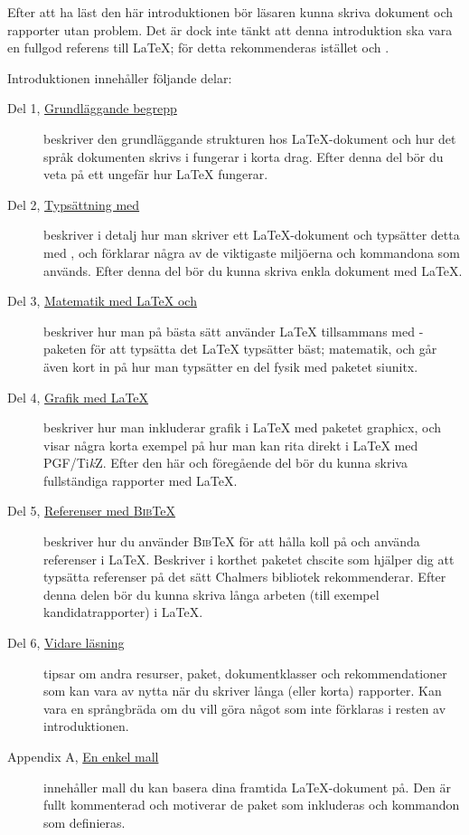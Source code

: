 \documentclass[swe,12pt]{skrapport}
\newcommand\pack[1]{\textsf{#1}}						%
\newcommand\pdfLaTeX{\hologo{pdfLaTeX}}					%
\newcommand\BibTeX{\textsc{Bib}\TeX}					%
\newcommand\PGFTikZ{PGF/Ti\emph{k}Z}					%
\begin{document}
	Efter att ha läst den här introduktionen bör läsaren kunna skriva
	dokument och rapporter utan problem. Det är dock inte tänkt att denna
	introduktion ska vara en fullgod referens till \LaTeX; för detta
	rekommenderas istället  och
	.
	
	Introduktionen innehåller följande delar:
	\begin{description}
		\item[{Del 1, \hyperref[sec:1]{Grundläggande begrepp}}]
		beskriver den grundläggande strukturen hos \LaTeX-dokument och hur det
		språk dokumenten skrivs i fungerar i korta drag. Efter denna del bör
		du veta på ett ungefär hur \LaTeX{} fungerar.
		
		\item[{Del 2, \hyperref[sec:2]{Typsättning med \pdfLaTeX}}]
		beskriver i detalj hur man skriver ett \LaTeX-dokument och typsätter
		detta med \pdfLaTeX, och förklarar några av de viktigaste miljöerna
		och kommandona som används. Efter denna del bör du kunna skriva enkla
		dokument med \LaTeX.
		
		\item[{Del 3, \hyperref[sec:3]{Matematik med \LaTeX{} och \AmS}}]
		beskriver hur man på bästa sätt använder \LaTeX{} tillsammans med
		\AmS-paketen för att typsätta det \LaTeX{} typsätter bäst; matematik,
		och går även kort in på hur man typsätter en del fysik med paketet
		\pack{siunitx}.
		
		\item[{Del 4, \hyperref[sec:4]{Grafik med \LaTeX}}]
		beskriver hur man inkluderar grafik i \LaTeX{} med paketet
		\pack{graphicx}, och visar några korta exempel på hur man kan rita
		direkt i \LaTeX{} med \PGFTikZ{}. Efter den här och föregående del bör
		du kunna skriva fullständiga rapporter med \LaTeX.
		
		\item[{Del 5, \hyperref[sec:5]{Referenser med \BibTeX}}]
		beskriver hur du använder \BibTeX{} för att hålla koll på och använda
		referenser i \LaTeX. Beskriver i korthet paketet \pack{chscite} som
		hjälper dig att typsätta referenser på det sätt Chalmers bibliotek
		rekommenderar. Efter denna delen bör du kunna skriva långa arbeten
		(till exempel kandidatrapporter) i \LaTeX.
		
		\item[{Del 6, \hyperref[sec:6]{Vidare läsning}}]
		tipsar om andra resurser, paket, dokumentklasser och rekommendationer
		som kan vara av nytta när du skriver långa (eller korta) rapporter.
		Kan vara en språngbräda om du vill göra något som inte förklaras i
		resten av introduktionen.
		
		\item[Appendix A, {\hyperref[app:1]{En enkel mall}}]
		innehåller mall du kan basera dina framtida \LaTeX{}-dokument
		på. Den är fullt kommenterad och motiverar de paket som inkluderas och
		kommandon som definieras.
	\end{description}
	
\end{document}
